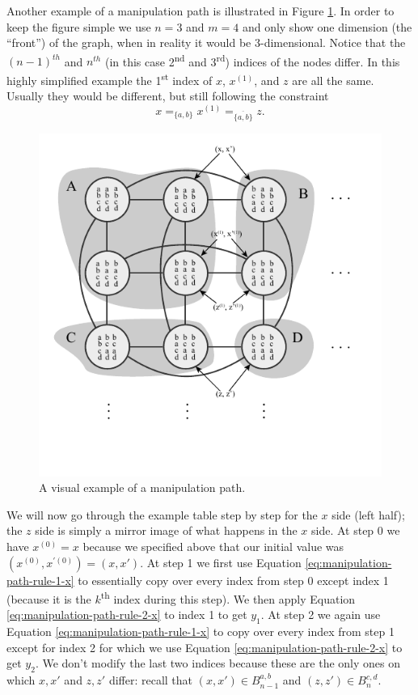 	Another example of a manipulation path is illustrated in Figure \ref{fig:manipulation-path}. In order to keep the figure simple we use $n = 3$ and $m = 4$ and only show one dimension (the ``front'') of the graph, when in reality it would be 3-dimensional. Notice that the $(n - 1)^{th}$ and $n^{th}$ (in this case 2\textsuperscript{nd} and 3\textsuperscript{rd}) indices of the nodes differ. In this highly simplified example the 1\textsuperscript{st} index of $x$, $x^{(1)}$, and $z$ are all the same. Usually they would be different, but still following the constraint
	\[
		x =_{\{a, b\}} x^{(1)} =_{\overline{\{a, b\}}} z.
	\]
	\begin{figure}[ht]
		\begin{center}
			\includegraphics[width=5in]{../figures/diagram7.pdf}
			\caption{A visual example of a manipulation path.}
			\label{fig:manipulation-path}
		\end{center}
	\end{figure}


	We will now go through the example table step by step for the $x$ side (left half); the $z$ side is simply a mirror image of what happens in the $x$ side. At step 0 we have $x^{(0)} = x$ because we specified above that our initial value was $(x^{(0)}, x^{\prime(0)}) = (x,x')$. At step 1 we first use Equation \ref{eq:manipulation-path-rule-1-x} to essentially copy over every index from step 0 except index 1 (because it is the $k$\textsuperscript{th} index during this step). We then apply Equation \ref{eq:manipulation-path-rule-2-x} to index 1 to get $y_1$. At step 2 we again use Equation \ref{eq:manipulation-path-rule-1-x} to copy over every index from step 1 except for index 2 for which we use Equation \ref{eq:manipulation-path-rule-2-x} to get $y_2$. We don't modify the last two indices because these are the only ones on which $x, x'$ and $z, z'$ differ: recall that $(x, x') \in B_{n-1}^{a,b}$ and $(z, z') \in B_{n}^{c,d}$.


